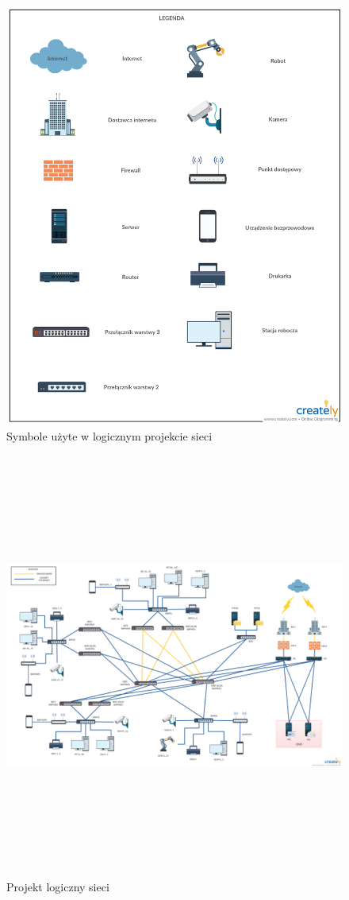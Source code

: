 \documentclass[12pt,a4paper,titlepage]{article}
\begin{document}
\begin{figure}[H]
  \centering
    \includegraphics[width=14cm]{images/Legenda.png}
    \caption{Symbole użyte w logicznym projekcie sieci}
    \label{fig:Legenda}
\end{figure}

\newpage
\begin{figure}[H]
  \centering
    \includegraphics[height=14cm, angle=90]{images/Logical_diagram.png}
    \caption{Projekt logiczny sieci}
    \label{fig:Projekt}
\end{figure}
\end{document}
